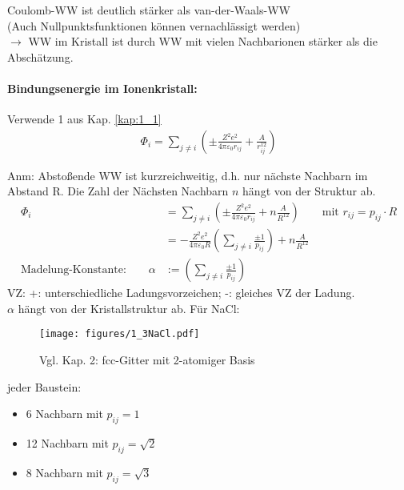 	Coulomb-WW ist deutlich stärker als van-der-Waals-WW \\
	(Auch Nullpunktsfunktionen können vernachlässigt werden)\\
	$\rightarrow$ WW im Kristall ist durch WW mit vielen Nachbarionen stärker als die Abschätzung.

\paragraph{Bindungsenergie im Ionenkristall:}
	Verwende 1 aus Kap. \ref{kap:1_1}
	\begin{align*}
		\Phi_i  = \sum_{j \neq i} \left(\pm \frac{Z^2 e^2}{4 \pi \varepsilon_0 r_{ij}} + \frac{A}{r_{ij}^{12}}\right)
	\end{align*}

	Anm: Abstoßende WW ist kurzreichweitig, d.h. nur nächste Nachbarn im Abstand R. Die Zahl der Nächsten Nachbarn $n$ hängt von der Struktur ab.
	\begin{align*}
		\Phi_i                                   & = \sum_{j \neq i} \left(\pm \frac{Z^2 e^2}{4 \pi \varepsilon_0 r_{ij}} + n\frac{A}{R^{12}}\right)
		\qquad \text{mit } r_{ij} = p_{ij} \cdot R                                                                                                                 \\
												& = - \frac{Z^2 e^2}{4 \pi \varepsilon_0 R} \left(\sum_{j \neq i} \frac{\pm 1}{p_{ij}}\right) + n\frac{A}{R^{12}} \\
		\text{Madelung-Konstante:} \qquad \alpha & := \left(\sum_{j \neq i} \frac{\pm 1}{p_{ij}}\right)
	\end{align*}
	VZ: +: unterschiedliche Ladungsvorzeichen; -: gleiches VZ der Ladung.\\
	$\alpha$ hängt von der Kristallstruktur ab. Für NaCl:
	\begin{figure}
		\centering
		\texttt{[image: figures/1\_3NaCl.pdf]}
		\caption{Vgl. Kap. 2: fcc-Gitter mit 2-atomiger Basis}
	\end{figure}
	jeder Baustein:
	\begin{itemize}
		\item 6 Nachbarn mit $p_{ij} =  1$
		\item 12 Nachbarn mit $p_{ij} =  \sqrt{2}$
		\item 8 Nachbarn mit $p_{ij} =  \sqrt{3}$
	\end{itemize}

